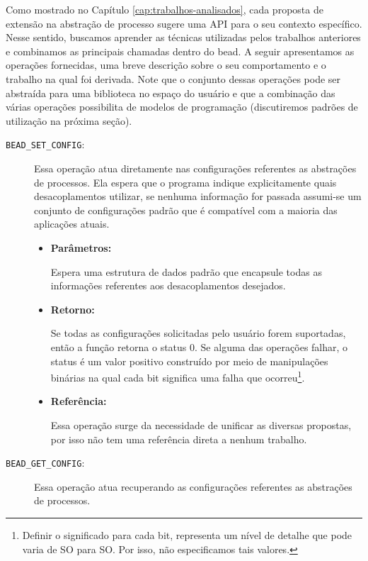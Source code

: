 Como mostrado no Capítulo \ref{cap:trabalhos-analisados}, cada proposta de
extensão na abstração de processo sugere uma API para o seu contexto
específico. Nesse sentido, buscamos aprender as técnicas utilizadas pelos
trabalhos anteriores e combinamos as principais chamadas dentro do bead. A
seguir apresentamos as operações fornecidas, uma breve descrição sobre o seu
comportamento  e o trabalho na qual foi derivada.  Note que o conjunto dessas
operações pode ser abstraída para uma biblioteca no espaço do usuário e que a
combinação das várias operações possibilita de modelos de programação
(discutiremos padrões de utilização na próxima seção). 

\begin{description}
  \item [\texttt{BEAD\_SET\_CONFIG}:]

Essa operação atua diretamente nas configurações referentes as abstrações de
processos. Ela espera que o programa indique explicitamente quais
desacoplamentos utilizar, se nenhuma informação for passada assumi-se um
conjunto de configurações padrão que é compatível com a maioria das aplicações
atuais.

  \begin{itemize}
    \item \textbf{Parâmetros:}

Espera uma estrutura de dados padrão que encapsule todas as informações
referentes aos desacoplamentos desejados.

    \item \textbf{Retorno:}

Se todas as configurações solicitadas pelo usuário forem suportadas, então a
função retorna o status 0. Se alguma das operações falhar, o status é um valor
positivo construído por meio de manipulações binárias na qual cada bit
significa uma falha que ocorreu\footnote{Definir o significado para cada bit,
representa um nível de detalhe que pode varia de SO para SO. Por isso, não
especificamos tais valores.}. 

    \item \textbf{Referência:}

Essa operação surge da necessidade de unificar as diversas propostas, por isso
não tem uma referência direta a nenhum trabalho.

	\end{itemize}

  \item [\texttt{BEAD\_GET\_CONFIG}:]

Essa operação atua recuperando as configurações referentes as abstrações de
processos. 


\end{description}
